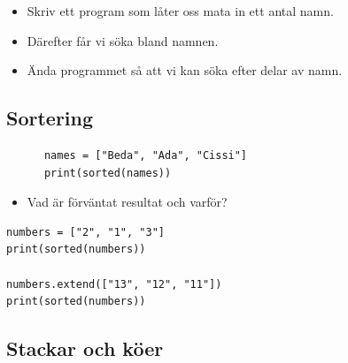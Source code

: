 \begin{frame}[fragile]
  \begin{exercise}[search.py]
    \begin{itemize}
      \item Skriv ett program som låter oss mata in ett antal 
        namn.
      \item Därefter får vi söka bland namnen.
    \end{itemize}
  \end{exercise}

  \begin{exercise}
    \begin{itemize}
      \item Ända programmet så att vi kan söka efter delar av namn.
    \end{itemize}
  \end{exercise}
\end{frame}

\subsection{Sortering}

\begin{frame}[fragile]
  \begin{example}[Sortering]
    \begin{verbatim}
      names = ["Beda", "Ada", "Cissi"]
      print(sorted(names))
    \end{verbatim}
  \end{example}

  \begin{exercise}
    \begin{itemize}
      \item Vad är förväntat resultat och varför?
    \end{itemize}
    \begin{verbatim}
numbers = ["2", "1", "3"]
print(sorted(numbers))

numbers.extend(["13", "12", "11"])
print(sorted(numbers))
    \end{verbatim}
  \end{exercise}
\end{frame}


\subsection{Stackar och köer}

\begin{frame}[fragile]
  \begin{example}[pile.py]
    \inputminted{python}{examples/pile.py}
  \end{example}
\end{frame}

